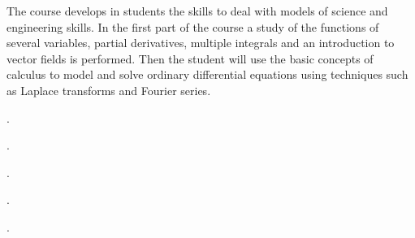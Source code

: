 \begin{syllabus}


\begin{justification}

The course develops in students the skills to deal with models of science and engineering skills. In the first part
of the course a study of the functions of several variables, partial derivatives, multiple integrals and an
introduction to vector fields is performed. Then the student will use the basic concepts of calculus to model
and solve ordinary differential equations using techniques such as Laplace transforms and Fourier series.

\end{justification}

\begin{goals}
  \item . %
  \item . %
  \item . %
  \item . %
  \item . %
\end{goals}

\begin{outcomes} 
    \item {}  
    \item {}
\end{outcomes}

\begin{competences}  
    \item {}
    \item {}
\end{competences}


\end{syllabus}
